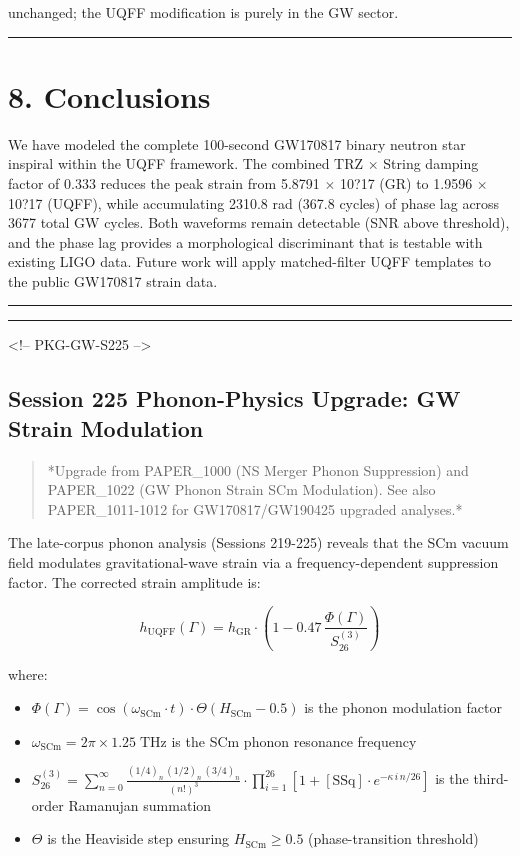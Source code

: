 \documentclass[11pt]{article}
\begin{document}
unchanged; the UQFF modification is purely in the GW sector.

\noindent\rule{\textwidth}{0.4pt}

\section*{8. Conclusions}

We have modeled the complete 100-second GW170817 binary neutron star inspiral within the UQFF framework. The combined TRZ $\times$ String damping factor of 0.333 reduces the peak strain from 5.8791 $\times$ 10?17 (GR) to 1.9596 $\times$ 10?17 (UQFF), while accumulating 2310.8 rad (367.8 cycles) of phase lag across 3677 total GW cycles. Both waveforms remain detectable (SNR above threshold), and the phase lag provides a morphological discriminant that is testable with existing LIGO data. Future work will apply matched-filter UQFF templates to the public GW170817 strain data.

\noindent\rule{\textwidth}{0.4pt}

\noindent\rule{\textwidth}{0.4pt}

<!-- PKG-GW-S225 -->

\subsection*{Session 225 Phonon-Physics Upgrade: GW Strain Modulation}

\begin{quote}
*Upgrade from PAPER\_1000 (NS Merger Phonon Suppression) and PAPER\_1022
(GW Phonon Strain SCm Modulation). See also PAPER\_1011-1012 for
GW170817/GW190425 upgraded analyses.*
\end{quote}

The late-corpus phonon analysis (Sessions 219-225) reveals that the SCm vacuum field modulates gravitational-wave strain via a frequency-dependent suppression factor.  The corrected strain amplitude is:

$$h_{\text{UQFF}}(\Gamma) = h_{\text{GR}} \cdot \left(1 - 0.47\,\frac{\Phi(\Gamma)}{S_{26}^{(3)}}\right)$$

where:

\begin{itemize}
  \item $\Phi(\Gamma) = \cos(\omega_{\text{SCm}} \cdot t) \cdot \Theta(H_{\text{SCm}} - 0.5)$ is the phonon modulation factor
  \item $\omega_{\text{SCm}} = 2\pi \times 1.25\;\text{THz}$ is the SCm phonon resonance frequency
  \item $S_{26}^{(3)} = \sum_{n=0}^{\infty} \frac{(1/4)_n\,(1/2)_n\,(3/4)_n}{(n!)^3} \cdot \prod_{i=1}^{26}\left[1 + [\text{SSq}]\cdot e^{-\kappa\,i\,n/26}\right]$ is the third-order Ramanujan summation
  \item $\Theta$ is the Heaviside step ensuring $H_{\text{SCm}} \geq 0.5$ (phase-transition threshold)
\end{itemize}
\end{document}
